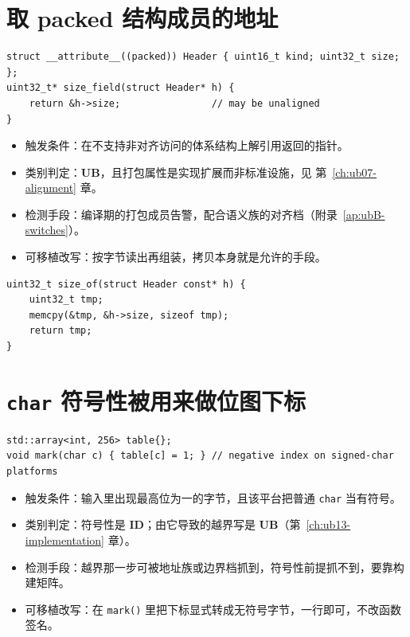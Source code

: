 \documentclass[12pt,a4paper,fontset=fandol]{ctexbook}
\newcommand{\Fn}[1]{\texttt{#1()}}
\newcommand{\Tp}[1]{\texttt{#1}}
\newcommand{\UB}{\textbf{\textsf{UB}}}
\newcommand{\IDB}{\textbf{\textsf{ID}}}
\begin{document}
\section{取 packed 结构成员的地址}
\begin{lstlisting}[style=cstyle, caption={反例：把打包成员的地址当对齐指针返回}]
struct __attribute__((packed)) Header { uint16_t kind; uint32_t size; };
uint32_t* size_field(struct Header* h) {
    return &h->size;                // may be unaligned
}
\end{lstlisting}
\begin{itemize}
\item 触发条件：在不支持非对齐访问的体系结构上解引用返回的指针。
\item 类别判定：\UB{}，且打包属性是实现扩展而非标准设施，见 第~\ref{ch:ub07-alignment} 章。
\item 检测手段：编译期的打包成员告警，配合语义族的对齐档（附录~\ref{ap:ubB-switches}）。
\item 可移植改写：按字节读出再组装，拷贝本身就是允许的手段。
\end{itemize}
\begin{lstlisting}[style=cstyle, caption={改写：先拷贝到对齐的局部量}]
uint32_t size_of(struct Header const* h) {
    uint32_t tmp;
    memcpy(&tmp, &h->size, sizeof tmp);
    return tmp;
}
\end{lstlisting}

\section{\Tp{char} 符号性被用来做位图下标}
\begin{lstlisting}[style=cppstyle, caption={反例：依赖普通 char 是无符号}]
std::array<int, 256> table{};
void mark(char c) { table[c] = 1; } // negative index on signed-char platforms
\end{lstlisting}
\begin{itemize}
\item 触发条件：输入里出现最高位为一的字节，且该平台把普通 \Tp{char} 当有符号。
\item 类别判定：符号性是 \IDB{}；由它导致的越界写是 \UB{}（第~\ref{ch:ub13-implementation} 章）。
\item 检测手段：越界那一步可被地址族或边界档抓到，符号性前提抓不到，要靠构建矩阵。
\item 可移植改写：在 \Fn{mark} 里把下标显式转成无符号字节，一行即可，不改函数签名。
\end{itemize}
\end{document}

